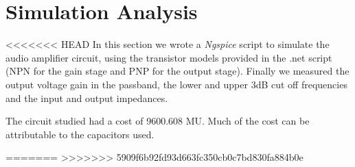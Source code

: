 \section{Simulation Analysis}
\label{sec:simulation}

<<<<<<< HEAD
In this section we wrote a \textit{Ngspice} script to simulate the audio
amplifier circuit, using the transistor models provided in the .net script
(NPN for the gain stage and PNP for the output stage).
Finally we measured the output voltage gain in the passband,
the lower and upper 3dB cut off frequencies and the input and output
impedances.


The circuit studied had a cost of 9600.608 MU. Much of the cost can be
attributable to the capacitors used.

=======
>>>>>>> 5909f6b92fd93d663fc350cb0c7bd830fa884b0e

